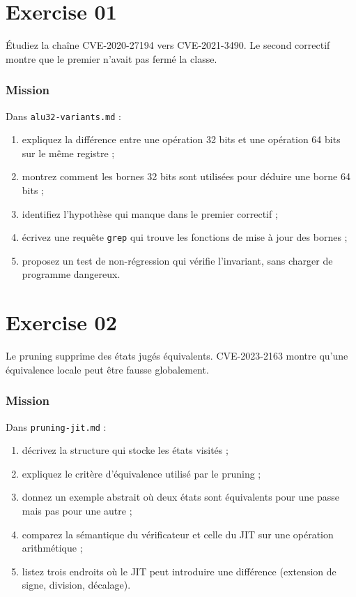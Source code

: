 \documentclass{training}
\begin{document}
\chapter{Exercise 01}
\makeheaderfiles

Étudiez la chaîne CVE-2020-27194 vers CVE-2021-3490. Le second correctif
montre que le premier n'avait pas fermé la classe.

\subsection*{Mission}

Dans \texttt{alu32-variants.md} :

\begin{enumerate}
  \item expliquez la différence entre une opération 32 bits et une
        opération 64 bits sur le même registre ;
  \item montrez comment les bornes 32 bits sont utilisées pour déduire une
        borne 64 bits ;
  \item identifiez l'hypothèse qui manque dans le premier correctif ;
  \item écrivez une requête \texttt{grep} qui trouve les fonctions de mise
        à jour des bornes ;
  \item proposez un test de non-régression qui vérifie l'invariant, sans
        charger de programme dangereux.
\end{enumerate}

\chapter{Exercise 02}
\makeheaderfiles

Le pruning supprime des états jugés équivalents. CVE-2023-2163 montre
qu'une équivalence locale peut être fausse globalement.

\subsection*{Mission}

Dans \texttt{pruning-jit.md} :

\begin{enumerate}
  \item décrivez la structure qui stocke les états visités ;
  \item expliquez le critère d'équivalence utilisé par le pruning ;
  \item donnez un exemple abstrait où deux états sont équivalents pour une
        passe mais pas pour une autre ;
  \item comparez la sémantique du vérificateur et celle du JIT sur une
        opération arithmétique ;
  \item listez trois endroits où le JIT peut introduire une différence
        (extension de signe, division, décalage).
\end{enumerate}
\end{document}
